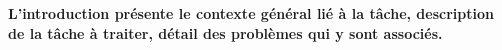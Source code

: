 
\textbf{L'introduction présente le contexte général lié à la tâche, description de la tâche à traiter, détail des problèmes qui y sont associés.} \\

\lipsum[2]